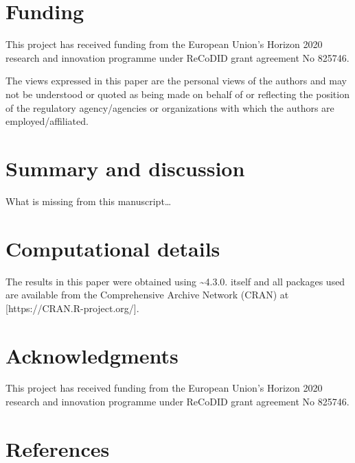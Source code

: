 \documentclass[
  article]{jss}
\newlength{\cslhangindent}
\newlength{\cslentryspacingunit} %
\newenvironment{CSLReferences}[2] %
 {%
  \setlength{\parindent}{0pt}
  \ifodd #1
  \let\oldpar\par
  \def\par{\hangindent=\cslhangindent\oldpar}
  \fi
  \setlength{\parskip}{#2\cslentryspacingunit}
 }%
 {}
\begin{document}
\hypertarget{funding}{%
\section{Funding}\label{funding}}

This project has received funding from the European Union's Horizon 2020
research and innovation programme under ReCoDID grant agreement No
825746.

The views expressed in this paper are the personal views of the authors
and may not be understood or quoted as being made on behalf of or
reflecting the position of the regulatory agency/agencies or
organizations with which the authors are employed/affiliated.

\hypertarget{sec-summary}{%
\section{Summary and discussion}\label{sec-summary}}

What is missing from this manuscript\ldots{}

\hypertarget{computational-details}{%
\section*{Computational details}\label{computational-details}}

The results in this paper were obtained using
\textasciitilde4.3.0.  itself and all packages
used are available from the Comprehensive  Archive Network
(CRAN) at {[}https://CRAN.R-project.org/{]}.

\hypertarget{acknowledgments}{%
\section*{Acknowledgments}\label{acknowledgments}}

This project has received funding from the European Union's Horizon 2020
research and innovation programme under ReCoDID grant agreement No
825746.

\hypertarget{references}{%
\section*{References}\label{references}}

\hypertarget{refs}{}
\begin{CSLReferences}{0}{0}
\end{CSLReferences}
\end{document}

